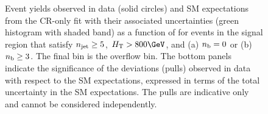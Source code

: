 \begin{figure}[!tbhp]
  \begin{center}
  \end{center}
  \caption{Event yields observed in data (solid circles) and SM
    expectations from the CR-only fit with their associated
    uncertainties (green histogram with shaded band) as a function of
    \mht for events in the signal region that satisfy $n_{\text{jet}} \geq
    5$, $\scalht > 800\GeV$, and (a) $n_{\mathrm{b}} = 0$ or (b) $n_{\mathrm{b}} \geq
    3$. The final bin is the overflow bin. The bottom panels indicate
    the significance of the deviations (pulls) observed in data with respect
    to the SM expectations, expressed in terms of the total
    uncertainty in the SM expectations. The pulls are indicative only
    and cannot be considered independently.  
    \label{fig:mht-templates} 
  }
\end{figure}

